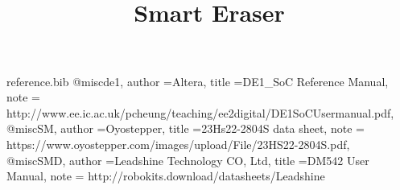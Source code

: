 %
\RequirePackage{filecontents}
\begin{filecontents*}{reference.bib}
	@misc{de1,
	author			={Altera},
	title			={{DE1\_SoC Reference Manual}},
	note			=	{http://www.ee.ic.ac.uk/pcheung/teaching/ee2digital/DE1SoCUsermanual.pdf,
	}
}
	@misc{SM,
	author			={Oyostepper},
	title			={{23Hs22-2804S data sheet}},
	note			=	{https://www.oyostepper.com/images/upload/File/23HS22-2804S.pdf,
	}
}
	@misc{SMD,
	author			={Leadshine Technology CO, Ltd},
	title			={{DM542 User Manual}},
	note			=	{http://robokits.download/datasheets/Leadshine%
	}
}
\end{filecontents*}

\documentclass[12pt,onecolumn]{IEEEtran}			%
\usepackage{dtk-logos}						%
\usepackage{graphics}
\usepackage{float}
\usepackage{caption} 
\usepackage[export]{adjustbox}


\title{ \hfill  \vspace{2in} \\Smart Eraser \vspace{0.05in} }	

